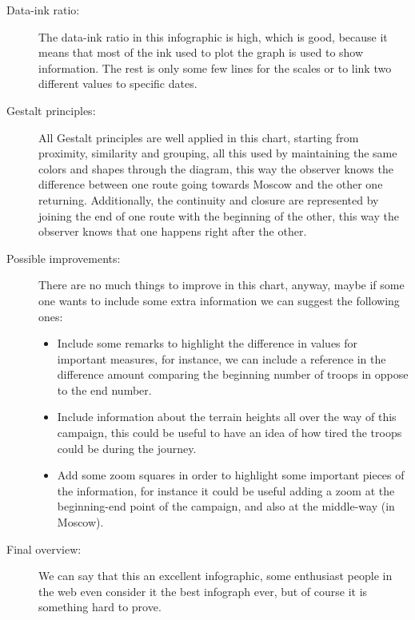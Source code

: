 \documentclass{article}
\begin{document}
\begin{description}
    \item[Data-ink ratio:] The data-ink ratio in this infographic is high, which is good, because it means that most of the ink used to plot the graph is used to show information. The rest is only some few lines for the scales or to link two different values to specific dates.
    \item[Gestalt principles:] All Gestalt principles are well applied in this chart, starting from proximity, similarity and grouping, all this used by maintaining the same colors and shapes through the diagram, this way the observer knows the difference between one route going towards Moscow and the other one returning.
    Additionally, the continuity and closure are represented by joining the end of one route with the beginning of the other, this way the observer knows that one happens right after the other.
    \item[Possible improvements:]
      There are no much things to improve in this chart, anyway, maybe if some one wants to include some extra information we can suggest the following ones:
      \begin{itemize}
        \item Include some remarks to highlight the difference in values for important measures, for instance, we can include a reference in the difference amount comparing the beginning number of troops in oppose to the end number.
        \item Include information about the terrain heights all over the way of this campaign, this could be useful to have an idea of how tired the troops could be during the journey.
        \item Add some zoom squares in order to highlight some important pieces of the information, for instance it could be useful adding a zoom at the beginning-end point of the campaign, and also at the middle-way (in Moscow).
      \end{itemize}
    \item[Final overview:]We can say that this an excellent infographic, some enthusiast people in the web even consider it the best infograph ever, but of course it is something hard to prove.
  \end{description}
\newpage
\end{document}

